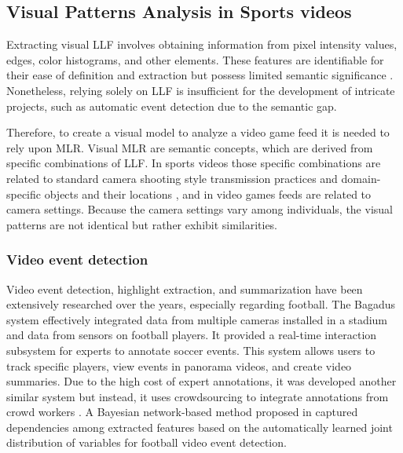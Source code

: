 \subsection{Visual Patterns Analysis in Sports videos}

    Extracting visual \gls{LLF} involves obtaining information from pixel intensity values, edges, color histograms, and other elements. These features are identifiable for their ease of definition and extraction but possess limited semantic significance \cite{INTERACTION_BETWEEN_MODULES_IN_LEARNING_SYSTEMS_FO}. Nonetheless, relying solely on \gls{LLF} is insufficient for the development of intricate projects, such as automatic event detection due to the semantic gap.

    Therefore, to create a visual model to analyze a video game feed it is needed to rely upon \gls{MLR}. Visual \gls{MLR} are semantic concepts, which are derived from specific combinations of \gls{LLF}. In sports videos those specific combinations are related to standard camera shooting style transmission practices and domain-specific objects and their locations \cite{SOCCER_VIDEO_EVENT_DETECTION}, and in video games feeds are related to camera settings. Because the camera settings vary among individuals, the visual patterns are not identical but rather exhibit similarities.

\subsubsection*{Video event detection}

    Video event detection, highlight extraction, and summarization have been extensively researched over the years, especially regarding football. The Bagadus system \cite{RTS_soccer_analytics} effectively integrated data from multiple cameras installed in a stadium and data from sensors on football players. It provided a real-time interaction subsystem for experts to annotate soccer events. This system allows users to track specific players, view events in panorama videos, and create video summaries. Due to the high cost of expert annotations, it was developed another similar system but instead, it uses crowdsourcing to integrate annotations from crowd workers \cite{Crowd-based_Semantic_Event_Detection}. A Bayesian network-based method proposed in \cite{EventDetectionAndSummarizationInSoccerVideosUsingBayesianNetworkAndCopula} captured dependencies among extracted features based on the automatically learned joint distribution of variables for football video event detection.

